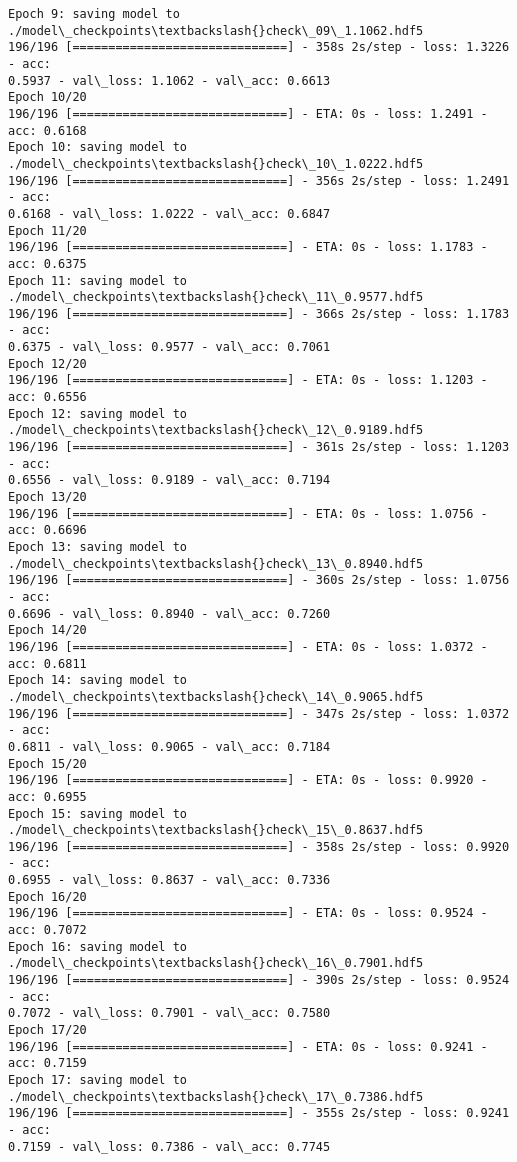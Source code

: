 \documentclass[11pt]{article}
\begin{document}
\begin{Verbatim}[commandchars=\\\{\}]
Epoch 9: saving model to ./model\_checkpoints\textbackslash{}check\_09\_1.1062.hdf5
196/196 [==============================] - 358s 2s/step - loss: 1.3226 - acc:
0.5937 - val\_loss: 1.1062 - val\_acc: 0.6613
Epoch 10/20
196/196 [==============================] - ETA: 0s - loss: 1.2491 - acc: 0.6168
Epoch 10: saving model to ./model\_checkpoints\textbackslash{}check\_10\_1.0222.hdf5
196/196 [==============================] - 356s 2s/step - loss: 1.2491 - acc:
0.6168 - val\_loss: 1.0222 - val\_acc: 0.6847
Epoch 11/20
196/196 [==============================] - ETA: 0s - loss: 1.1783 - acc: 0.6375
Epoch 11: saving model to ./model\_checkpoints\textbackslash{}check\_11\_0.9577.hdf5
196/196 [==============================] - 366s 2s/step - loss: 1.1783 - acc:
0.6375 - val\_loss: 0.9577 - val\_acc: 0.7061
Epoch 12/20
196/196 [==============================] - ETA: 0s - loss: 1.1203 - acc: 0.6556
Epoch 12: saving model to ./model\_checkpoints\textbackslash{}check\_12\_0.9189.hdf5
196/196 [==============================] - 361s 2s/step - loss: 1.1203 - acc:
0.6556 - val\_loss: 0.9189 - val\_acc: 0.7194
Epoch 13/20
196/196 [==============================] - ETA: 0s - loss: 1.0756 - acc: 0.6696
Epoch 13: saving model to ./model\_checkpoints\textbackslash{}check\_13\_0.8940.hdf5
196/196 [==============================] - 360s 2s/step - loss: 1.0756 - acc:
0.6696 - val\_loss: 0.8940 - val\_acc: 0.7260
Epoch 14/20
196/196 [==============================] - ETA: 0s - loss: 1.0372 - acc: 0.6811
Epoch 14: saving model to ./model\_checkpoints\textbackslash{}check\_14\_0.9065.hdf5
196/196 [==============================] - 347s 2s/step - loss: 1.0372 - acc:
0.6811 - val\_loss: 0.9065 - val\_acc: 0.7184
Epoch 15/20
196/196 [==============================] - ETA: 0s - loss: 0.9920 - acc: 0.6955
Epoch 15: saving model to ./model\_checkpoints\textbackslash{}check\_15\_0.8637.hdf5
196/196 [==============================] - 358s 2s/step - loss: 0.9920 - acc:
0.6955 - val\_loss: 0.8637 - val\_acc: 0.7336
Epoch 16/20
196/196 [==============================] - ETA: 0s - loss: 0.9524 - acc: 0.7072
Epoch 16: saving model to ./model\_checkpoints\textbackslash{}check\_16\_0.7901.hdf5
196/196 [==============================] - 390s 2s/step - loss: 0.9524 - acc:
0.7072 - val\_loss: 0.7901 - val\_acc: 0.7580
Epoch 17/20
196/196 [==============================] - ETA: 0s - loss: 0.9241 - acc: 0.7159
Epoch 17: saving model to ./model\_checkpoints\textbackslash{}check\_17\_0.7386.hdf5
196/196 [==============================] - 355s 2s/step - loss: 0.9241 - acc:
0.7159 - val\_loss: 0.7386 - val\_acc: 0.7745

\end{Verbatim}
\end{document}
